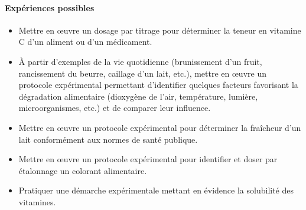 \documentclass[11pt]{report}
\numberwithin{figure}{section}
\numberwithin{equation}{section}
\numberwithin{table}{section}
\newcommand{\1}{\boldsymbol{1}}
\begin{document}
\paragraph{Expériences possibles}
\begin{itemize}
\item Mettre en œuvre un dosage par titrage pour déterminer la
teneur en vitamine C d’un aliment ou d’un médicament. 
\item À partir d’exemples de la vie quotidienne (brunissement d’un
fruit, rancissement du beurre, caillage d’un lait, etc.), mettre en
œuvre un protocole expérimental permettant d’identifier
quelques facteurs favorisant la dégradation
alimentaire (dioxygène de l’air, température, lumière,
microorganismes, etc.) et de comparer leur influence.
\item Mettre en œuvre un protocole expérimental pour déterminer la
fraîcheur d’un lait conformément aux normes de santé
publique.
\item Mettre en œuvre un protocole expérimental pour identifier et
doser par étalonnage un colorant alimentaire.
\item Pratiquer une démarche expérimentale mettant en évidence la
solubilité des vitamines.
\end{itemize}
\end{document}
